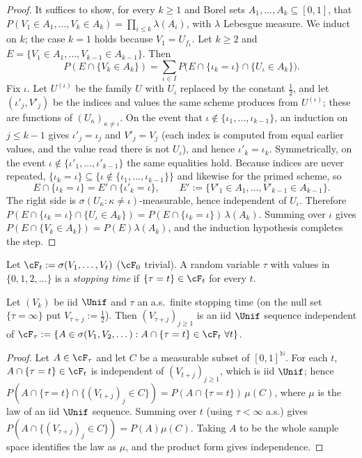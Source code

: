 \documentclass[11pt]{report}
\begin{document}
\begin{proof}
It suffices to show, for every $k\ge1$ and Borel sets $A_1,\dots,A_k\subseteq[0,1]$, that
$P(V_1\in A_1,\dots,V_k\in A_k)=\prod_{i\le k}\lambda(A_i)$, with $\lambda$ Lebesgue measure. We induct on $k$; the
case $k=1$ holds because $V_1=U_{f_1}$. Let $k\ge2$ and $E=\{V_1\in A_1,\dots,V_{k-1}\in A_{k-1}\}$. Then
\[
P(E\cap\{V_k\in A_k\})=\sum_{\iota\in I}P\big(E\cap\{\iota_k=\iota\}\cap\{U_\iota\in A_k\}\big).
\]
Fix $\iota$. Let $U^{(\iota)}$ be the family $U$ with $U_\iota$ replaced by the constant $\tfrac12$, and let
$(\iota'_j,V'_j)$ be the indices and values the same scheme produces from $U^{(\iota)}$; these are functions of
$(U_\kappa)_{\kappa\ne\iota}$. On the event that $\iota\notin\{\iota_1,\dots,\iota_{k-1}\}$, an induction on
$j\le k-1$ gives $\iota'_j=\iota_j$ and $V'_j=V_j$ (each index is computed from equal earlier values, and the value read
there is not $U_\iota$), and hence $\iota'_k=\iota_k$. Symmetrically, on the event
$\iota\notin\{\iota'_1,\dots,\iota'_{k-1}\}$ the same equalities hold. Because indices are never repeated,
$\{\iota_k=\iota\}\subseteq\{\iota\notin\{\iota_1,\dots,\iota_{k-1}\}\}$ and likewise for the primed scheme, so
\[
E\cap\{\iota_k=\iota\}=E'\cap\{\iota'_k=\iota\},\qquad E':=\{V'_1\in A_1,\dots,V'_{k-1}\in A_{k-1}\}.
\]
The right side is $\sigma(U_\kappa:\kappa\ne\iota)$-measurable, hence independent of $U_\iota$. Therefore
$P(E\cap\{\iota_k=\iota\}\cap\{U_\iota\in A_k\})=P(E\cap\{\iota_k=\iota\})\,\lambda(A_k)$. Summing over $\iota$
gives $P(E\cap\{V_k\in A_k\})=P(E)\lambda(A_k)$, and the induction hypothesis completes the step.
\end{proof}

Let $\cF_t:=\sigma(V_1,\dots,V_t)$ ($\cF_0$ trivial). A random variable $\tau$ with values in
$\{0,1,2,\dots\}$ is a \emph{stopping time} if $\{\tau=t\}\in\cF_t$ for every $t$.

\begin{T11lemma}\label{T11:lem:fresh}
Let $(V_k)$ be iid $\Unif$ and $\tau$ an a.s.\ finite stopping time (on the null set $\{\tau=\infty\}$ put
$V_{\tau+j}:=\tfrac12$). Then $(V_{\tau+j})_{j\ge1}$ is an iid $\Unif$ sequence independent of
$\cF_\tau:=\{A\in\sigma(V_1,V_2,\dots):A\cap\{\tau=t\}\in\cF_t\ \forall t\}$.
\end{T11lemma}

\begin{proof}
Let $A\in\cF_\tau$ and let $C$ be a measurable subset of $[0,1]^{\mathbb N}$. For each $t$,
$A\cap\{\tau=t\}\in\cF_t$ is independent of $(V_{t+j})_{j\ge1}$, which is iid $\Unif$; hence
$P(A\cap\{\tau=t\}\cap\{(V_{t+j})_j\in C\})=P(A\cap\{\tau=t\})\,\mu(C)$, where $\mu$ is the law of an iid $\Unif$
sequence. Summing over $t$ (using $\tau<\infty$ a.s.) gives
$P(A\cap\{(V_{\tau+j})_j\in C\})=P(A)\mu(C)$. Taking $A$ to be the whole sample space identifies the law as $\mu$, and the product form
gives independence.
\end{proof}
\end{document}
